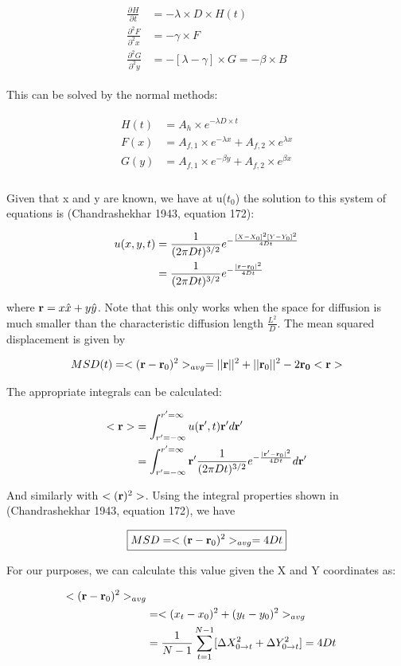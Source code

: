 \documentclass[paper=a4, fontsize=11pt]{scrartcl} %
\numberwithin{equation}{section} %
\numberwithin{figure}{section} %
\numberwithin{table}{section} %
\newcommand{\ndiffn}[3]{\frac{\partial^{#3}#1}{\partial^{#3}#2}}
\newcommand{\diffn}[2]{\ndiffn{#1}{#2}{}}
\newcommand{\vect}[1]{\bold{#1}}
\newcommand{\eqs}[1]{
\begin{align} 
\begin{split}
#1
\end{split}					
\end{align}}
\begin{document}
\eqs{
 \diffn{H}{t} &= -\lambda \times D \times H(t) \\ 
 \ndiffn{F}{x}{2} &= - \gamma \times F  \\
\ndiffn{G}{y}{2} &=  -[\lambda - \gamma] \times G  = - \beta \times B}

This can be solved by the normal methods:

\eqs{
H(t) &= A_h \times e^{-\lambda D \times t} \\
F(x) &= A_{f,1} \times e^{-\lambda x} + A_{f,2} \times e^{\lambda x} \\
G(y) &= A_{f,1} \times e^{-\beta y} + A_{f,2} \times e^{\beta x} \\}

Given that x and y are known, we have at u($t_0$) the solution to this system of equations is (Chandrashekhar 1943, equation 172):

\eqs{
 u(x,y,t) 
&= \frac{1}{(2 \pi D t)^{3/2}} e^{-\frac{[X - X_0]^2[Y-Y_0]^2}{4 D t}  } \\
 &=  \frac{1}{(2 \pi D t)^{3/2}} e^{-\frac{|\vect{r} - \vect{r}_0|^2}{4 D t}  }  }

where $\vect{r} = x\hat{x} + y \hat{y}$. Note that this only works when the space for diffusion is much smaller than the characteristic diffusion length $\frac{L^2}{D}$. The mean squared displacement is given by

\eqs{ MSD(t) 
  &= <(\vect{r} - \vect{r}_0)^2>_{avg} =  ||\vect{r}||^2 + ||\vect{r}_0||^2 - 2 \vect{r_0} <\vect{r}> \\
}

The appropriate integrals can be calculated:

\eqs{  <\vect{r}>
 &= \int_{r'=-\infty}^{r'=\infty} u(\vect{r'},t) \vect{r'} d\vect{r' } \\
&=  \int_{r'=-\infty}^{r'=\infty}
 \vect{r'} \frac{1}{(2 \pi D t)^{3/2}} e^{-\frac{|\vect{r'} - \vect{r}_0|^2}{4 D t}}  d\vect{r'} \\}

And similarly with $<(\vect{r})^2>$. Using the integral properties shown in (Chandrashekhar 1943, equation 172), we have 

\eqs{ \boxed{MSD = <(\vect{r} - \vect{r}_0)^2>_{avg} = 4 D t }}

For our purposes, we can calculate this value given the X and Y coordinates as:

\eqs{  <(\vect{r} - \vect{r}_0)^2>_{avg}\\
 &=  <(x_t - x_0)^2 + (y_t-y_0)^2>_{avg}  \\
&= \frac{1}{N-1} \sum_{t=1}^{N-1} [\Delta X_{0\rightarrow t}^2
 + \Delta Y_{0 \rightarrow t}^2] = 4Dt }
\end{document}
